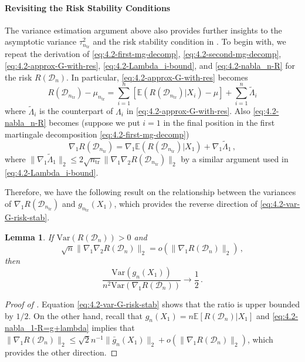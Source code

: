 \documentclass[11pt]{article}
\theoremstyle{plain}
\newtheorem{lemma}[theorem]{Lemma}
\newcommand{\tr}{{\mathrm{tr}}}
\newcommand{\D}{{\mathcal{D}}}
\newcommand{\var}{\mathrm{Var}}
\begin{document}
\paragraph{Revisiting the Risk Stability Conditions}
The variance estimation argument above also provides further insights to the asymptotic variance $\tau_{n_\tr}^2$ and the risk stability condition in .  To begin with, we repeat the derivation of \eqref{eq:4.2-first-mg-decomp}, \eqref{eq:4.2-second-mg-decomp}, \eqref{eq:4.2-approx-G-with-res}, \eqref{eq:4.2-Lambda_i-bound}, and \eqref{eq:4.2-nabla_n-R} for the risk $R(\D_n)$. In particular, \eqref{eq:4.2-approx-G-with-res} becomes
\begin{equation*}
    R(\D_{n_\tr})-\mu_{n_\tr} = \sum_{i=1}^n\left[ \mathbb E(R(\D_{n_\tr})|X_i)-\mu\right]+\sum_{i=1}^n \tilde \Lambda_i
\end{equation*}
where $\tilde\Lambda_i$ is the counterpart of $\Lambda_i$ in \eqref{eq:4.2-approx-G-with-res}.
Also \eqref{eq:4.2-nabla_n-R} becomes (suppose we put $i=1$ in the final position in the first martingale decomposition \eqref{eq:4.2-first-mg-decomp})
\begin{equation}\label{eq:4.2-nabla_1-R=g+lambda}
    \nabla_1 R(\D_{n_\tr}) = \nabla_1 \mathbb E(R(\D_{n_\tr})|X_1)+\nabla_1\tilde\Lambda_1\,,
\end{equation}
where $\|\nabla_1\tilde\Lambda_1\|_2\le 2\sqrt{n_\tr}\|\nabla_1\nabla_2 R(\D_{n_\tr})\|_2$ by a similar argument used in \eqref{eq:4.2-Lambda_i-bound}.

Therefore, we have the following result on the relationship between the variances of $\nabla_1 R(\D_{n_\tr})$ and $g_{n_\tr}(X_1)$, which provides the reverse direction of \eqref{eq:4.2-var-G-risk-stab}.
\begin{lemma}
    \label{lem:4.2-nabla_1-R-var}
    If $\var(R(\D_n))>0$ and \begin{equation}
        \label{eq:4.2-2nabla-1nabla}
        \sqrt{n}\|\nabla_1\nabla_2 R(\D_n)\|_2 = o(\|\nabla_1 R(\D_n)\|_2)\,,
    \end{equation}
    then 
    $$
    \frac{\var(g_n(X_1))}{n^2\var(\nabla_1 R(\D_n) )}\rightarrow \frac{1}{2}\,.
    $$
\end{lemma}
\begin{proof}
    [Proof of ]
    Equation \eqref{eq:4.2-var-G-risk-stab} shows that the ratio is upper bounded by $1/2$.  On the other hand, recall that $g_n(X_1)=n \mathbb E[R(\D_n)|X_1]$ and \eqref{eq:4.2-nabla_1-R=g+lambda} implies that
    $\|\nabla_1 R(\D_n)\|_2\le \sqrt{2}n^{-1}\|\bar g_n(X_1)\|_2+o(\|\nabla_1 R(\D_n)\|_2)$, which provides the other direction.
\end{proof}
\end{document}
